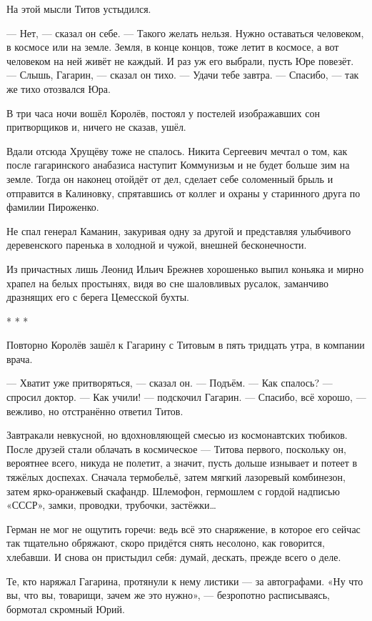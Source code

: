 На этой мысли Титов устыдился.

— Нет, — сказал он себе. — Такого желать нельзя. Нужно оставаться человеком, в космосе или на земле. Земля, в конце концов, тоже летит в космосе, а вот человеком на ней живёт не каждый. И раз уж его выбрали, пусть Юре повезёт.
— Слышь, Гагарин, — сказал он тихо. — Удачи тебе завтра.
— Спасибо, — так же тихо отозвался Юра.

В три часа ночи вошёл Королёв, постоял у постелей изображавших сон притворщиков
и, ничего не сказав, ушёл.

Вдали отсюда Хрущёву тоже не спалось. Никита Сергеевич мечтал о том, как после
гагаринского анабазиса наступит Коммунизьм и не будет больше зим на земле.
Тогда он наконец отойдёт от дел, сделает себе соломенный брыль и отправится в
Калиновку, спрятавшись от коллег и охраны у старинного друга по фамилии
Пироженко.

Не спал генерал Каманин, закуривая одну за другой и представляя улыбчивого
деревенского паренька в холодной и чужой, внешней бесконечности.

Из причастных лишь Леонид Ильич Брежнев хорошенько выпил коньяка и мирно храпел
на белых простынях, видя во сне шаловливых русалок, заманчиво дразнящих его с
берега Цемесской бухты.

*   *   *

Повторно Королёв зашёл к Гагарину с Титовым в пять тридцать утра, в компании врача.

— Хватит уже притворяться, — сказал он. — Подъём.
— Как спалось? — спросил доктор.
— Как учили! — подскочил Гагарин.
— Спасибо, всё хорошо, — вежливо, но отстранённо ответил Титов.

Завтракали невкусной, но вдохновляющей смесью из космонавтских тюбиков. После
друзей стали облачать в космическое — Титова первого, поскольку он, вероятнее
всего, никуда не полетит, а значит, пусть дольше изнывает и потеет в тяжёлых
доспехах. Сначала термобельё, затем мягкий лазоревый комбинезон, затем
ярко-оранжевый скафандр. Шлемофон, гермошлем с гордой надписью «СССР», замки,
проводки, трубочки, застёжки…

Герман не мог не ощутить горечи: ведь всё это снаряжение, в которое его сейчас
так тщательно обряжают, скоро придётся снять несолоно, как говорится, хлебавши.
И снова он пристыдил себя: думай, дескать, прежде всего о деле.

Те, кто наряжал Гагарина, протянули к нему листики — за автографами. «Ну что
вы, что вы, товарищи, зачем же это нужно», — безропотно расписываясь, бормотал
скромный Юрий.

